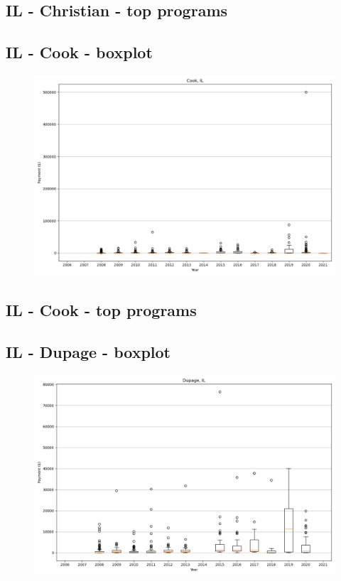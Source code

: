 \subsection*{IL - Christian - top programs}

\newpage
\subsection*{IL - Cook - boxplot}
\begin{figure}[h]
\centering
\includegraphics[width=7in]{../output/boxplots/counties/Cook-IL_boxplot.png}
\end{figure}


\subsection*{IL - Cook - top programs}

\newpage
\subsection*{IL - Dupage - boxplot}
\begin{figure}[h]
\centering
\includegraphics[width=7in]{../output/boxplots/counties/Dupage-IL_boxplot.png}
\end{figure}


